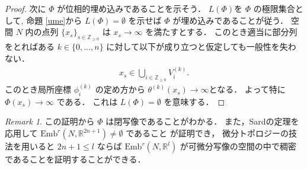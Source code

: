 \documentclass[leqno, a4paper, 12pt]{jsarticle}
\theoremstyle{plain}
\theoremstyle{definition}
\theoremstyle{remark}
\newtheorem{rmk}{Remark}[section]
\newcommand{\zz}{\mathbb{Z}}
\newcommand{\rr}{\mathbb{R}}
\newcommand{\yoembsym}{\mathrm{Emb}}
\newcommand{\yolimset}[1]{L(#1)}
\numberwithin{equation}{section}
\begin{document}
\begin{proof}
次に
$\Phi$
が位相的埋め込みであることを示そう．
$\yolimset{\Phi}$を
$\Phi$
の極限集合として, 
命題
\ref{ume}から
$\yolimset{\Phi}=\emptyset$
を示せば
$\Phi$
が埋め込みであることが従う．
空間
$N$
内の点列
$\{x_{s}\}_{s\in \zz_{\ge 0}}$
は
$x_{s}\to \infty$
を満たすとする．
このとき適当に部分列をとればある
$k\in \{0, \dots, n\}$
に対して以下が成り立つと仮定しても一般性を失わない．
\begin{align}
x_{s}\in \bigcup_{i\in \zz_{\ge 0}}V_{i}^{(k)}. 
\end{align}
このとき局所座標
$\phi_{i}^{(k)}$
の定め方から
$\theta^{(k)}(x_{s})\to \infty$となる．
よって特に
$\Phi(x_{s})\to \infty$
である．
これは
$\yolimset{\Phi}=\emptyset$
を意味する．
\end{proof}

\begin{rmk}
この証明から
$\Phi$
は閉写像であることがわかる．
また，Sardの定理を応用して
$\yoembsym^{r}(N, \rr^{2n+1})\neq \emptyset$
であること
が証明でき，
微分トポロジーの技法を用いると
$2n+1\le l$
ならば
$\yoembsym^{r}(N, \rr^{l})$
が可微分写像の空間の中で稠密であることを証明することができる．
\end{rmk}






\end{document}
